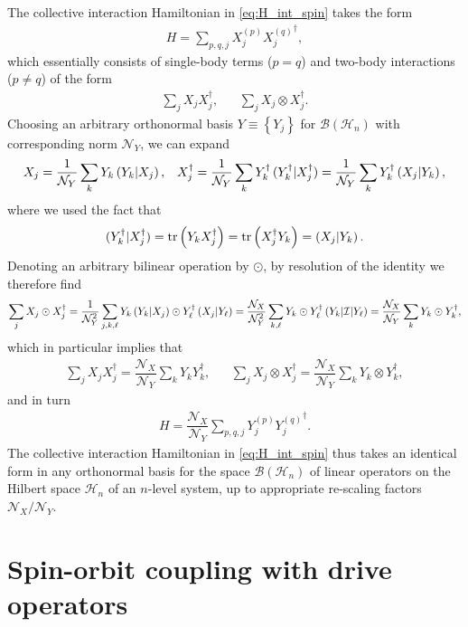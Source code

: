 \documentclass[nofootinbib,notitlepage,11pt]{revtex4-2}
\newcommand{\f}[2]{\dfrac{#1}{#2}} %
\newcommand{\p}[1]{\left(#1\right)} %
\renewcommand{\set}[1]{\left\{#1\right\}} %
\newcommand{\1}{\mathds{1}}
\newcommand{\B}{\mathcal{B}}
\renewcommand{\H}{\mathcal{H}}
\newcommand{\I}{\mathcal{I}}
\newcommand{\N}{\mathcal{N}}
\def\obk#1{\mathinner{({#1})}}
\begin{document}
The collective interaction Hamiltonian in \eqref{eq:H_int_spin} takes
the form
\begin{align}
  H = \sum_{p,q,j} X_j^{(p)} {X_j^{(q)}}^\dag,
\end{align}
which essentially consists of single-body terms ($p=q$) and two-body
interactions ($p\ne q$) of the form
\begin{align}
  \sum_j X_j X_j^\dag,
  &&
  \sum_j X_j \otimes X_j^\dag.
\end{align}
Choosing an arbitrary orthonormal basis $Y\equiv\set{Y_j}$ for
$\B\p{\H_n}$ with corresponding norm $\N_Y$, we can expand
\begin{align}
  X_j = \f1{\N_Y} \sum_k Y_k \obk{Y_k|X_j},
  &&
  X_j^\dag = \f1{\N_Y} \sum_k Y_k^\dag \obk{Y_k^\dag|X_j^\dag}
  = \f1{\N_Y} \sum_k Y_k^\dag \obk{X_j|Y_k},
\end{align}
where we used the fact that
\begin{align}
  \obk{Y_k^\dag|X_j^\dag}
  = \tr\p{Y_k X_j^\dag}
  = \tr\p{X_j^\dag Y_k}
  = \obk{X_j|Y_k}.
\end{align}
Denoting an arbitrary bilinear operation by $\odot$, by resolution of
the identity we therefore find
\begin{align}
  \sum_j X_j \odot X_j^\dag
  = \f1{\N_Y^2} \sum_{j,k,\ell} Y_k \obk{Y_k|X_j}
  \odot Y_\ell^\dag \obk{X_j|Y_\ell}
  = \f{\N_X}{\N_Y^2} \sum_{k,\ell} Y_k \odot Y_\ell^\dag
  \obk{Y_k|\I|Y_\ell}
  = \f{\N_X}{\N_Y} \sum_k Y_k \odot Y_k^\dag,
\end{align}
which in particular implies that
\begin{align}
  \sum_j X_j X_j^\dag
  = \f{\N_X}{\N_Y} \sum_k Y_k Y_k^\dag,
  &&
  \sum_j X_j \otimes X_j^\dag
  = \f{\N_X}{\N_Y} \sum_k Y_k \otimes Y_k^\dag,
\end{align}
and in turn
\begin{align}
  H = \f{\N_X}{\N_Y} \sum_{p,q,j} Y_j^{(p)} {Y_j^{(q)}}^\dag.
\end{align}
The collective interaction Hamiltonian in \eqref{eq:H_int_spin} thus
takes an identical form in any orthonormal basis for the space
$\B\p{\H_n}$ of linear operators on the Hilbert space $\H_n$ of an
$n$-level system, up to appropriate re-scaling factors $\N_X/\N_Y$.

\section{Spin-orbit coupling with drive operators}
\label{sec:lat_drive}
\end{document}
